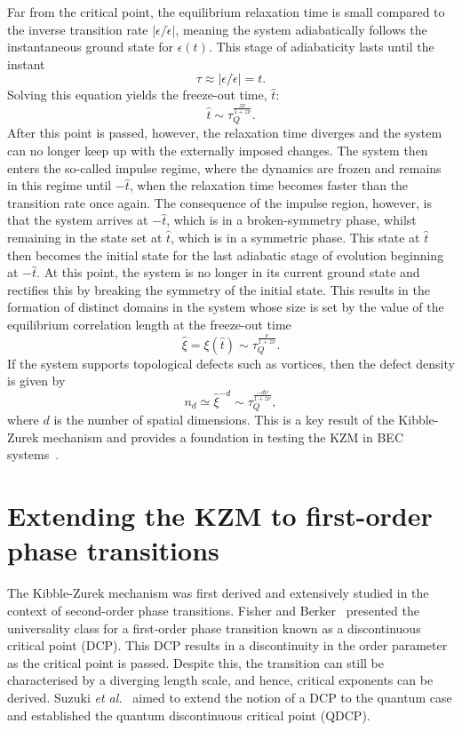 Far from the critical point, the equilibrium relaxation time is small compared
to the inverse transition rate \( |\epsilon/\dot{\epsilon}| \), meaning the system
adiabatically follows the instantaneous ground state for \( \epsilon(t) \).
This stage of adiabaticity lasts until the instant
\begin{equation}
    \tau \approx |\epsilon/\dot{\epsilon}|=t.
    \label{eq: freeze-out-equal}
\end{equation}
Solving this equation yields the freeze-out time, \( \hat{t} \):
\begin{equation}
    \hat{t} \sim \tau_Q^\frac{z\nu}{1 + z\nu}.
    \label{eq: freeze-out-scaling}
\end{equation}
After this point is passed, however, the relaxation time diverges and the system
can no longer keep up with the externally imposed changes.
The system then enters the so-called impulse regime, where the dynamics are
frozen and remains in this regime until \( -\hat{t} \), when the relaxation
time becomes faster than the transition rate once again.
The consequence of the impulse region, however, is that the system arrives at
\( -\hat{t} \), which is in a broken-symmetry phase, whilst remaining
in the state set at \( \hat{t} \), which is in a symmetric phase.
This state at \( \hat{t} \) then becomes the initial state for the last adiabatic
stage of evolution beginning at \( -\hat{t} \).
At this point, the system is no longer in its current ground state and rectifies
this by breaking the symmetry of the initial state.
This results in the formation of distinct domains in the system whose size is
set by the value of the equilibrium correlation length at the freeze-out time
\begin{equation}
    \hat{\xi}=\xi(\hat{t}) \sim \tau_Q^{\frac{\nu}{1 + z\nu}}.
    \label{eq: KZM-domain-size}
\end{equation}
If the system supports topological defects such as vortices, then the defect
density is given by
\begin{equation}
    n_d \simeq \hat{\xi}^{-d} \sim \tau_Q^{\frac{-d\nu}{1+z\nu}},
\end{equation}
where \( d \) is the number of spatial dimensions.
This is a key result of the Kibble-Zurek mechanism and provides a
foundation in testing the KZM in BEC systems~\cite{Damski2007, Swislocki2013,
Anquez2016, Saito2007A, Saito2007B}.

\section{Extending the KZM to first-order phase transitions}
The Kibble-Zurek mechanism was first derived and extensively studied in the
context of second-order phase transitions.
Fisher and Berker~\cite{Fisher1982} presented the universality class for
a first-order phase transition known as a discontinuous critical point (DCP).
This DCP results in a discontinuity in the order parameter as the critical point
is passed.
Despite this, the transition can still be characterised by a diverging length
scale, and hence, critical exponents can be derived.
Suzuki \textit{et al.}~\cite{Suzuki2015} aimed to extend the notion of a DCP to
the quantum case and established the quantum discontinuous critical point
(QDCP).

